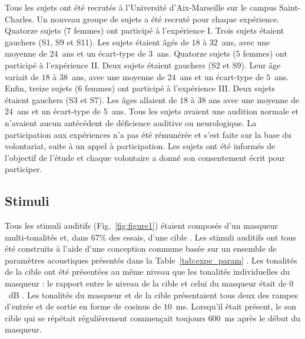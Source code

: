 Tous les sujets ont été recrutés à l'Université d'Aix-Marseille sur le campus Saint-Charles. 
Un nouveau groupe de sujets a été recruté pour chaque expérience. 
Quatorze sujets ($7$ femmes) ont participé à l'expérience I. 
Trois sujets étaient gauchers (S1, S9 et S11). 
Les sujets étaient âgés de $18$ à $32$~ans, avec une moyenne de $24$~ans et un écart-type de $3$~ans. 
Quatorze sujets ($5$ femmes) ont participé à l'expérience II. 
Deux sujets étaient gauchers (S2 et S9). 
Leur âge variait de $18$ à $38$~ans, avec une moyenne de $24$~ans et un écart-type de $5$~ans. 
Enfin, treize sujets ($6$ femmes) ont participé à l'expérience III. 
Deux sujets étaient gauchers (S3 et S7). 
Les âges allaient de $18$ à $38$ ans avec une moyenne de $24$~ans et un écart-type de $5$~ans. 
Tous les sujets avaient une audition normale et n'avaient aucun antécédent de déficience auditive ou neurologique. 
La participation aux expériences n'a pas été rémunérée et s'est faite sur la base du volontariat, suite à un appel à participation. 
Les sujets ont été informés de l'objectif de l'étude et chaque volontaire a donné son consentement écrit pour participer.

\subsection{Stimuli}
\label{chapitre4stimuli}

Tous les stimuli auditifs (Fig.~\ref{fig:figure1}) étaient composés d'un masqueur multi-tonalités et, dans $67$\% des essais, d'une cible \citep{dykstra2016neural, gutschalk2008neural, konigs2012functional, neff1987masking}. 
Les stimuli auditifs ont tous été construits à l'aide d'une conception commune basée sur un ensemble de paramètres acoustiques présentés dans la Table~\ref{tab:expe_param} \citep{akram2014investigating, elhilali2009interaction, elhilali2009temporal, giani2015detecting, gutschalk2008neural, wiegand2012correlates, wiegand2018cortical}. 
Les tonalités de la cible ont été présentées au même niveau que les tonalités individuelles du masqueur : le rapport entre le niveau de la cible et celui du masqueur était de $0$~dB \citep{dykstra2016neural}. 
Les tonalités du masqueur et de la cible présentaient tous deux des rampes d'entrée et de sortie en forme de cosinus de $10$~ms. 
Lorsqu'il était présent, le son cible qui se répétait régulièrement commençait toujours $600$~ms après le début du masqueur.


